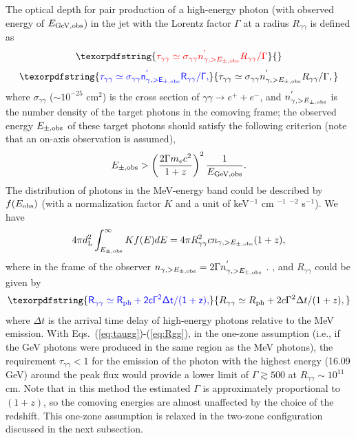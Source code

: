\documentclass[prd,twocolumn,amsmath,amssymb,aps,linenumbers]{revtex4-2} %
\providecommand{\DIFaddtex}[1]{{\protect\color{blue} \sf #1}} %
\providecommand{\DIFdeltex}[1]{{\protect\color{red} \scriptsize #1}} %
\providecommand{\DIFaddbegin}{} %
\providecommand{\DIFaddend}{} %
\providecommand{\DIFdelbegin}{} %
\providecommand{\DIFdelend}{} %
\providecommand{\DIFadd}[1]{\texorpdfstring{\DIFaddtex{#1}}{#1}} %
\providecommand{\DIFdel}[1]{\texorpdfstring{\DIFdeltex{#1}}{}} %
\newcommand{\DIFscaledelfig}{0.5}
\newlength{\DIFdelgraphicswidth} %
\newlength{\DIFdelgraphicsheight} %
\newcommand{\DIFaddincludegraphics}[2][]{{\color{blue}\fbox{\DIFOincludegraphics[#1]{#2}}}} %
\newcommand{\DIFdelincludegraphics}[2][]{%
\sbox{\DIFdelgraphicsbox}{\DIFOincludegraphics[#1]{#2}}%
\settoboxwidth{\DIFdelgraphicswidth}{\DIFdelgraphicsbox} %
\settoboxtotalheight{\DIFdelgraphicsheight}{\DIFdelgraphicsbox} %
\scalebox{\DIFscaledelfig}{%
\parbox[b]{\DIFdelgraphicswidth}{\usebox{\DIFdelgraphicsbox}\\[-\baselineskip] \rule{\DIFdelgraphicswidth}{0em}}\llap{\resizebox{\DIFdelgraphicswidth}{\DIFdelgraphicsheight}{%
\setlength{\unitlength}{\DIFdelgraphicswidth}%
\begin{picture}(1,1)%
\thicklines\linethickness{2pt} %
{\color[rgb]{1,0,0}\put(0,0){\framebox(1,1){}}}%
{\color[rgb]{1,0,0}\put(0,0){\line( 1,1){1}}}%
{\color[rgb]{1,0,0}\put(0,1){\line(1,-1){1}}}%
\end{picture}%
}\hspace*{3pt}}} %
} %
\DeclareRobustCommand{\DIFaddbegin}{\DIFOaddbegin \let\includegraphics\DIFaddincludegraphics} %
\DeclareRobustCommand{\DIFaddend}{\DIFOaddend \let\includegraphics\DIFOincludegraphics} %
\DeclareRobustCommand{\DIFdelbegin}{\DIFOdelbegin \let\includegraphics\DIFdelincludegraphics} %
\DeclareRobustCommand{\DIFdelend}{\DIFOaddend \let\includegraphics\DIFOincludegraphics} %
\begin{document}
\DIFdelend \DIFaddbegin \label{sec:gammalowlimit}
 \DIFaddend The optical depth for pair production of a high-energy photon (with observed energy of $E_{\rm GeV, obs}$) in the jet with the Lorentz factor $\Gamma$ at a radius $R_{\gamma\gamma}$ is defined as
\DIFdelbegin \begin{displaymath}\DIFdel{%
\tau_{\gamma\gamma}\simeq \sigma_{\gamma\gamma} n^{'}_{\gamma, >E_{\pm, \rm obs}}R_{\gamma\gamma} /\Gamma   
}\end{displaymath}%
\DIFdelend \DIFaddbegin \begin{equation}\DIFadd{\label{eq:taugg}
\tau_{\gamma\gamma}\simeq \sigma_{\gamma\gamma} n^{'}_{\gamma, >E_{\pm, \rm obs}}R_{\gamma\gamma} /\Gamma,
}\end{equation}\DIFaddend 
 where $\sigma_{\gamma\gamma}$ ($\sim10^{-25}$ cm$^{2}$) is the cross section of $\gamma\gamma\rightarrow e^{+}+e^{-}$, and $n^{'}_{\gamma, >E_{\pm,\rm obs}}$ is the number density of the target photons in the comoving frame; the observed energy $E_{\pm, \rm obs}$ of these target photons should satisfy the following criterion (note that an on-axis observation is assumed),
\begin{equation}\label{eq:Eobs}
 E_{\pm, \rm obs}>\left(\frac{2\Gamma m_ec^2}{1+z}\right)^2\frac{1}{E_{\rm GeV, obs}}.
\end{equation}
The distribution of photons in the MeV-energy band could be described by $f(E_{\rm obs})$ (with a normalization factor $K$ and a unit of keV$^{-1}$ cm\DIFdelbegin \DIFdel{$^{-1}$ }\DIFdelend \DIFaddbegin \DIFadd{$^{-2}$ }\DIFaddend s$^{-1}$). We have %
\begin{eqnarray}\label{eq:Eobs2}
     4\pi d^2_{\rm L}\int_{E_{\pm,\rm obs}}^\infty Kf(E)dE =4\pi R_{\gamma\gamma}^2 c n_{\gamma, >E_{\pm,\rm obs}}(1+z),
\end{eqnarray}
where in the frame of the observer $n_{\gamma, >E_{\pm,\rm obs}}=2\Gamma n^{'}_{\gamma, >E_{\pm,\rm obs}}$\DIFdelbegin \DIFdel{. 
}\DIFdelend \DIFaddbegin \DIFadd{, and $R_{\gamma\gamma}$ could be given by
}\begin{equation}\DIFadd{\label{eq:Rgg}
   R_{\gamma\gamma}\simeq R_{\rm ph} +2c\Gamma^2\Delta t/(1+z),
}\end{equation}
\DIFadd{where $\Delta t$ is the arrival time delay of high-energy photons relative to the MeV emission.
With Eqs.~(\ref{eq:taugg})-(\ref{eq:Rgg}), in the one-zone assumption (i.e., if the GeV photons were produced in the same region as the MeV photons), the requirement $\tau_{\gamma\gamma}<1$ for the emission of the photon with the highest energy (16.09 GeV) around the peak flux would provide a lower limit of $\Gamma\gtrsim500$ at $R_{\gamma\gamma}\sim10^{11}$ cm. Note that in this method the estimated $\Gamma$ is approximately proportional to $(1+z)$, so the comoving energies are almost unaffected by the choice of the redshift. This one-zone assumption is relaxed in the two-zone configuration discussed in the next subsection.
}\DIFaddend 
\end{document}

